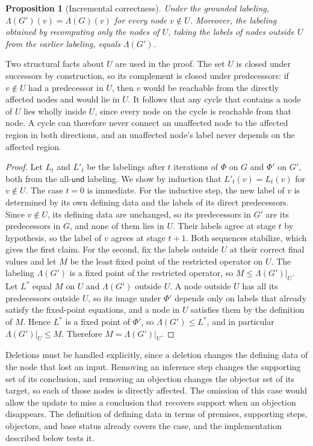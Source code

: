 \documentclass[12pt]{article}
\newtheorem{proposition}{Proposition}
\theoremstyle{definition}
\theoremstyle{remark}
\begin{document}
\begin{proposition}[Incremental correctness]
\label{prop:incremental}
Under the grounded labeling, $\Lambda(G')(v)=\Lambda(G)(v)$ for every node $v\notin U$. Moreover, the labeling obtained by recomputing only the nodes of $U$, taking the labels of nodes outside $U$ from the earlier labeling, equals $\Lambda(G')$.
\end{proposition}

Two structural facts about $U$ are used in the proof. The set $U$ is closed under successors by construction, so its complement is closed under predecessors: if $v\notin U$ had a predecessor in $U$, then $v$ would be reachable from the directly affected nodes and would lie in $U$. It follows that any cycle that contains a node of $U$ lies wholly inside $U$, since every node on the cycle is reachable from that node. A cycle can therefore never connect an unaffected node to the affected region in both directions, and an unaffected node's label never depends on the affected region.

\begin{proof}
Let $L_t$ and $L'_t$ be the labelings after $t$ iterations of $\Phi$ on $G$ and $\Phi'$ on $G'$, both from the all-$\mathsf{und}$ labeling. We show by induction that $L'_t(v)=L_t(v)$ for $v\notin U$. The case $t=0$ is immediate. For the inductive step, the new label of $v$ is determined by its own defining data and the labels of its direct predecessors. Since $v\notin U$, its defining data are unchanged, so its predecessors in $G'$ are its predecessors in $G$, and none of them lies in $U$. Their labels agree at stage $t$ by hypothesis, so the label of $v$ agrees at stage $t+1$. Both sequences stabilize, which gives the first claim. For the second, fix the labels outside $U$ at their correct final values and let $M$ be the least fixed point of the restricted operator on $U$. The labeling $\Lambda(G')$ is a fixed point of the restricted operator, so $M\le\Lambda(G')|_U$. Let $L^\ast$ equal $M$ on $U$ and $\Lambda(G')$ outside $U$. A node outside $U$ has all its predecessors outside $U$, so its image under $\Phi'$ depends only on labels that already satisfy the fixed-point equations, and a node in $U$ satisfies them by the definition of $M$. Hence $L^\ast$ is a fixed point of $\Phi'$, so $\Lambda(G')\le L^\ast$, and in particular $\Lambda(G')|_U\le M$. Therefore $M=\Lambda(G')|_U$. \qedhere
\end{proof}

Deletions must be handled explicitly, since a deletion changes the defining data of the node that lost an input. Removing an inference step changes the supporting set of its conclusion, and removing an objection changes the objector set of its target, so each of those nodes is directly affected. The omission of this case would allow the update to miss a conclusion that recovers support when an objection disappears. The definition of defining data in terms of premises, supporting steps, objectors, and base status already covers the case, and the implementation described below tests it. 
\end{document}
